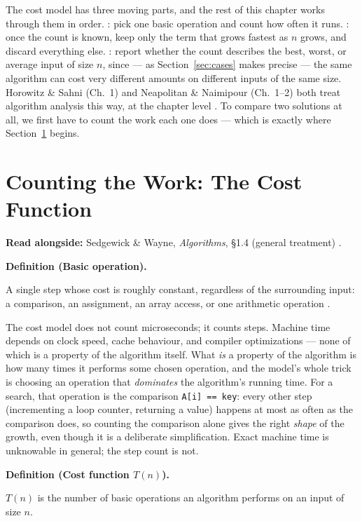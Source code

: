 \documentclass[11pt]{article}
\newenvironment{definitionbox}[1]{%
  \par\noindent\textbf{Definition (#1).}\ \itshape
}{\par\vspace{0.3em}}
\begin{document}
The cost model has three moving parts, and the rest of this chapter works
through them in order. : pick one basic operation and count how
often it runs. : once the count is known, keep only the term
that grows fastest as $n$ grows, and discard everything else. : report whether the count describes the best, worst, or average input
of size $n$, since --- as Section~\ref{sec:cases} makes precise --- the same
algorithm can cost very different amounts on different inputs of the same
size. Horowitz \& Sahni (Ch.~1) and Neapolitan \& Naimipour (Ch.~1--2) both
treat algorithm analysis this way, at the chapter level
\cite{HorowitzSahni2008_fundamentals_data_structures,Neapolitan2010_foundations_of_algorithms}.
To compare two solutions at all, we first have to count the work each one
does --- which is exactly where Section~\ref{sec:counting} begins.

\section{Counting the Work: The Cost Function}
\label{sec:counting}

\textbf{Read alongside:} Sedgewick \& Wayne, \textit{Algorithms}, \S1.4 (general treatment) \cite{Sedgewick2011_algorithms}.

\begin{definitionbox}{Basic operation}
A single step whose cost is roughly constant, regardless of the surrounding
input: a comparison, an assignment, an array access, or one arithmetic
operation \cite{Sedgewick2011_algorithms}.
\end{definitionbox}

The cost model does not count microseconds; it counts steps. Machine time
depends on clock speed, cache behaviour, and compiler optimizations --- none
of which is a property of the algorithm itself. What \emph{is} a property of
the algorithm is how many times it performs some chosen operation, and the
model's whole trick is choosing an operation that \emph{dominates} the
algorithm's running time. For a search, that operation is the comparison
\texttt{A[i] == key}: every other step (incrementing a loop counter,
returning a value) happens at most as often as the comparison does, so
counting the comparison alone gives the right \emph{shape} of the growth,
even though it is a deliberate simplification. Exact machine time is
unknowable in general; the step count is not.

\begin{definitionbox}{Cost function $T(n)$}
$T(n)$ is the number of basic operations an algorithm performs on an input
of size $n$.
\end{definitionbox}
\end{document}
